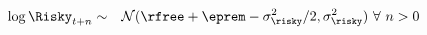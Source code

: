   \begin{equation}\begin{gathered}\begin{aligned}
        \log \Risky_{t+n} & \sim & \mathcal{N}(\rfree + \eprem - \sigma^{2}_{\risky}/2,\sigma^{2}_{\risky}) ~\forall~n>0 \label{eq:distRisky}
      \end{aligned}\end{gathered}\end{equation}
